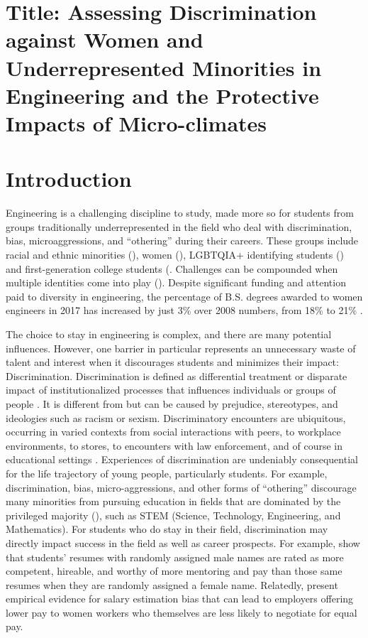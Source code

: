 \section{Title: Assessing Discrimination against Women and Underrepresented Minorities in Engineering and the Protective Impacts of Micro-climates}
\section{Introduction}
\label{sec:intro}

 
Engineering is a challenging discipline to study, made more so for students from groups traditionally underrepresented in the field who deal with discrimination, bias, microaggressions, and “othering” during their careers.
These groups include racial and ethnic minorities (\eg \cite{Mcgee:2011}), women (\eg \cite{Moss-Racusin:2012}), LGBTQIA+ identifying students (\eg \cite{Cech:2011}) and first-generation college students (\eg \cite{Pascarella:2004,carrigan2015onramping}.
Challenges can be compounded when multiple identities come into play (\eg \citep{Williams:2014}).
Despite significant funding and attention paid to diversity in engineering, the percentage of B.S. degrees awarded to women engineers in 2017 has increased by just 3\% over 2008 numbers, from 18\% to 21\% \citep{yoder2012engineering}. 
 
The choice to stay in engineering is complex, and there are many potential influences. However, one barrier in particular represents an unnecessary waste of talent and interest when it discourages students and minimizes their impact: Discrimination. Discrimination is defined as differential treatment or disparate impact of institutionalized processes that influences individuals or groups of people \citep{Pager:2008}. It is different from but can be caused by prejudice, stereotypes, and ideologies such as racism or sexism. Discriminatory encounters are ubiquitous, occurring in varied contexts from social interactions with peers, to workplace environments, to stores, to encounters with law enforcement, and of course in educational settings \cite{Fisher:2000}. Experiences of discrimination are undeniably consequential for the life trajectory of young people, particularly students. For example, discrimination, bias, micro-aggressions, and other forms of ``othering'' discourage many minorities from pursuing education in fields that are dominated by the privileged majority (\eg \cite{robinson2015racial}), such as STEM (Science, Technology, Engineering, and Mathematics). For students who do stay in their field, discrimination may directly impact success in the field as well as career prospects. For example, \citet{Moss-Racusin:2012} show that students' resumes with randomly assigned male names are rated as more competent, hireable, and worthy of more mentoring and pay than those same resumes when they are randomly assigned a female name. Relatedly, \citet{Williams:2010} present empirical evidence for salary estimation bias that can lead to employers offering lower pay to women workers who themselves are less likely to negotiate for equal pay. 

